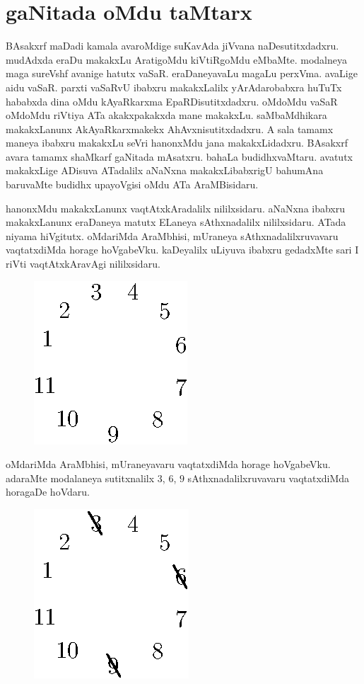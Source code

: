 \chapter{gaNitada oMdu taMtarx}

BAsakxrf maDadi kamala avaroMdige suKavAda jiVvana naDesutitxdadxru. mudAdxda eraDu makakxLu AratigoMdu kiVtiRgoMdu eMbaMte. modalneya maga sureVshf avanige hatutx vaSaR. eraDaneyavaLu magaLu perxVma. avaLige aidu vaSaR. parxti vaSaRvU ibabxru makakxLalilx yArAdarobabxra huTuTx hababxda dina oMdu kAyaRkarxma EpaRDisutitxdadxru. oMdoMdu vaSaR oMdoMdu riVtiya ATa akakxpakakxda mane makakxLu. saMbaMdhikara makakxLanunx AkAyaRkarxmakekx AhAvxnisutitxdadxru. A sala tamamx maneya ibabxru makakxLu seVri hanonxMdu jana makakxLidadxru. BAsakxrf avara tamamx shaMkarf gaNitada mAsatxru. bahaLa budidhxvaMtaru. avatutx makakxLige ADisuva ATadalilx aNaNxna makakxLibabxrigU bahumAna baruvaMte budidhx upayoVgisi oMdu ATa AraMBisidaru.

hanonxMdu makakxLanunx vaqtAtxkAradalilx nililxsidaru. aNaNxna ibabxru makakxLanunx eraDaneya matutx ELaneya sAthxnadalilx nililxsidaru. ATada niyama hiVgitutx. oMdariMda AraMbhisi, mUraneya sAthxnadalilxruvavaru vaqtatxdiMda horage hoVgabeVku. kaDeyalilx uLiyuva ibabxru gedadxMte sari I riVti vaqtAtxkAravAgi nililxsidaru.
\begin{figure}[H]
\centering
\includegraphics{src/figures/fig1.eps}
\end{figure}

oMdariMda AraMbhisi, mUraneyavaru vaqtatxdiMda horage hoVgabeVku. adaraMte modalaneya sutitxnalilx $3$, $6$, $9$ sAthxnadalilxruvavaru vaqtatxdiMda horagaDe hoVdaru.
\begin{figure}[H]
\centering
\includegraphics{src/figures/fig2.eps}
\end{figure}

